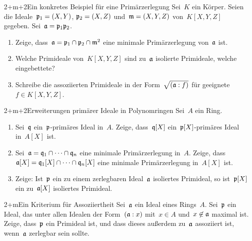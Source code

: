 \documentclass[entwurf]{uebblatt}
\begin{document}

\begin{aufgabe}{2+m+2}{Ein konkretes Beispiel für eine Primärzerlegung}
Sei~$K$ ein Körper. Seien die Ideale~$\mathfrak{p}_1 = (X,Y)$, $\mathfrak{p}_2 = (X,Z)$
und~$\mathfrak{m} = (X,Y,Z)$ von~$K[X,Y,Z]$ gegeben. Sei~$\mathfrak{a} = \mathfrak{p}_1 \mathfrak{p}_2$.
\begin{enumerate}
\item Zeige, dass~$\mathfrak{a} = \mathfrak{p}_1 \cap \mathfrak{p}_2 \cap \mathfrak{m}^2$ eine minimale
Primärzerlegung von~$\mathfrak{a}$ ist.
\item Welche Primideale von~$K[X,Y,Z]$ sind zu~$\mathfrak{a}$
isolierte Primideale, welche eingebettete?
\item Schreibe die assoziierten Primideale in der Form~$\sqrt{(\mathfrak{a}:f)}$ für
geeignete~$f \in K[X,Y,Z]$.
\end{enumerate}
\end{aufgabe}

\begin{aufgabe}{2+m+2}{Erweiterungen primärer Ideale in Polynomringen}
Sei~$A$ ein Ring.
\begin{enumerate}
\item Sei~$\mathfrak{q}$ ein~$\mathfrak{p}$-primäres Ideal
in~$A$. Zeige, dass~$\mathfrak{q}[X]$ ein~$\mathfrak{p}[X]$-primäres Ideal in~$A[X]$ ist.
\item Sei~$\mathfrak{a} = \mathfrak{q}_1 \cap \cdots \cap \mathfrak{q}_n$ eine minimale Primärzerlegung
in~$A$. Zeige, dass~$\mathfrak{a}[X] = \mathfrak{q}_1[X] \cap \cdots \cap \mathfrak{q}_n[X]$ eine
minimale Primärzerlegung in~$A[X]$ ist.
\item Zeige: Ist~$\mathfrak{p}$ ein zu einem zerlegbaren Ideal~$\mathfrak{a}$ isoliertes Primideal, so
ist~$\mathfrak{p}[X]$ ein zu~$\mathfrak{a}[X]$ isoliertes Primideal.
\end{enumerate}
\end{aufgabe}

\begin{aufgabe}{2+m}{Ein Kriterium für Assoziiertheit}
Sei~$\mathfrak{a}$ ein Ideal eines Rings~$A$.
Sei~$\mathfrak{p}$ ein Ideal, das unter allen Idealen der Form~$(\mathfrak{a}:x)$ mit~$x
\in A$ und~$x \not\in \mathfrak{a}$ maximal ist.
Zeige, dass~$\mathfrak{p}$ ein Primideal ist, und dass dieses außerdem zu~$\mathfrak{a}$
assoziiert ist, wenn~$\mathfrak{a}$ zerlegbar sein sollte.
\end{aufgabe}
\end{document}
